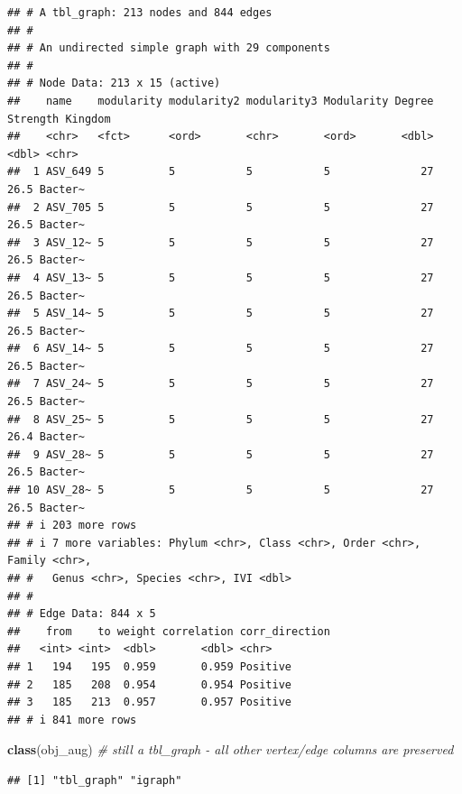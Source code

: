 \documentclass[
]{book}
\newenvironment{Shaded}{\begin{snugshade}}{\end{snugshade}}
\newcommand{\CommentTok}[1]{\textcolor[rgb]{0.56,0.35,0.01}{\textit{#1}}}
\newcommand{\FunctionTok}[1]{\textcolor[rgb]{0.13,0.29,0.53}{\textbf{#1}}}
\newcommand{\NormalTok}[1]{#1}
\begin{document}
\begin{verbatim}
## # A tbl_graph: 213 nodes and 844 edges
## #
## # An undirected simple graph with 29 components
## #
## # Node Data: 213 x 15 (active)
##    name    modularity modularity2 modularity3 Modularity Degree Strength Kingdom
##    <chr>   <fct>      <ord>       <chr>       <ord>       <dbl>    <dbl> <chr>  
##  1 ASV_649 5          5           5           5              27     26.5 Bacter~
##  2 ASV_705 5          5           5           5              27     26.5 Bacter~
##  3 ASV_12~ 5          5           5           5              27     26.5 Bacter~
##  4 ASV_13~ 5          5           5           5              27     26.5 Bacter~
##  5 ASV_14~ 5          5           5           5              27     26.5 Bacter~
##  6 ASV_14~ 5          5           5           5              27     26.5 Bacter~
##  7 ASV_24~ 5          5           5           5              27     26.5 Bacter~
##  8 ASV_25~ 5          5           5           5              27     26.4 Bacter~
##  9 ASV_28~ 5          5           5           5              27     26.5 Bacter~
## 10 ASV_28~ 5          5           5           5              27     26.5 Bacter~
## # i 203 more rows
## # i 7 more variables: Phylum <chr>, Class <chr>, Order <chr>, Family <chr>,
## #   Genus <chr>, Species <chr>, IVI <dbl>
## #
## # Edge Data: 844 x 5
##    from    to weight correlation corr_direction
##   <int> <int>  <dbl>       <dbl> <chr>         
## 1   194   195  0.959       0.959 Positive      
## 2   185   208  0.954       0.954 Positive      
## 3   185   213  0.957       0.957 Positive      
## # i 841 more rows
\end{verbatim}

\begin{Shaded}
\begin{Highlighting}[]
\FunctionTok{class}\NormalTok{(obj\_aug)  }\CommentTok{\# still a tbl\_graph {-} all other vertex/edge columns are preserved}
\end{Highlighting}
\end{Shaded}

\begin{verbatim}
## [1] "tbl_graph" "igraph"
\end{verbatim}
\end{document}
